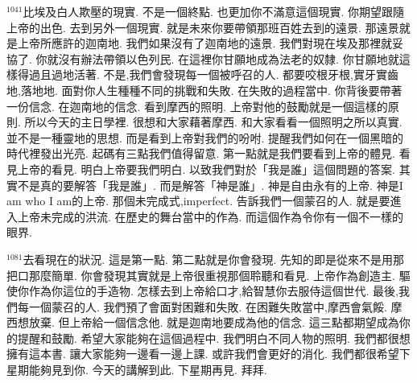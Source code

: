 \documentclass{book}
\begin{document}
$^{1041}$比埃及白人欺壓的現實.
不是一個終點.
也更加你不滿意這個現實.
你期望跟隨上帝的出色.
去到另外一個現實.
就是未來你要帶領那班百姓去到的遠景.
那遠景就是上帝所應許的迦南地.
我們如果沒有了迦南地的遠景.
我們對現在埃及那裡就妥協了.
你就沒有辦法帶領以色列民.
在這裡你甘願地成為法老的奴隸.
你甘願地就這樣得過且過地活著.
不是,我們會發現每一個被呼召的人.
都要咬根牙根,實牙實齒地,落地地.
面對你人生種種不同的挑戰和失敗.
在失敗的過程當中.
你背後要帶著一份信念.
在迦南地的信念.
看到摩西的照明.
上帝對他的鼓勵就是一個這樣的原則.
所以今天的主日學裡.
很想和大家藉著摩西.
和大家看看一個照明之所以真實.
並不是一種靈地的思想.
而是看到上帝對我們的吩咐.
提醒我們如何在一個黑暗的時代裡發出光亮.
起碼有三點我們值得留意.
第一點就是我們要看到上帝的體見.
看見上帝的看見.
明白上帝要我們明白.
以致我們對於「我是誰」這個問題的答案.
其實不是真的要解答「我是誰」.
而是解答「神是誰」.
神是自由永有的上帝.
神是I am who I am的上帝.
那個未完成式,imperfect.
告訴我們一個蒙召的人.
就是要進入上帝未完成的洪流.
在歷史的舞台當中的作為.
而這個作為令你有一個不一樣的眼界.

$^{1081}$去看現在的狀況.
這是第一點.
第二點就是你會發現.
先知的即是從來不是用那把口那麼簡單.
你會發現其實就是上帝很重視那個聆聽和看見.
上帝作為創造主.
驅使你作為你這位的手造物.
怎樣去到上帝給口才,給智慧你去服侍這個世代.
最後,我們每一個蒙召的人.
我們預了會面對困難和失敗.
在困難失敗當中,摩西會氣餒.
摩西想放棄.
但上帝給一個信念他.
就是迦南地要成為他的信念.
這三點都期望成為你的提醒和鼓勵.
希望大家能夠在這個過程中.
我們明白不同人物的照明.
我們都很想擁有這本書.
讓大家能夠一邊看一邊上課.
或許我們會更好的消化.
我們都很希望下星期能夠見到你.
今天的講解到此.
下星期再見.
拜拜.
\newpage
\end{document}
